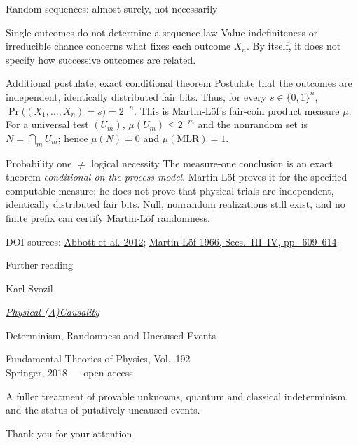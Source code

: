 \documentclass{beamer}
\newcommand{\doiref}[2]{%
  \href{https://doi.org/#1}{\textcolor{blue!65!black}{#2}}}
\newcommand{\sourcefoot}[1]{%
  \par\vfill{\tiny\color{black!60}DOI sources: #1\par}}
\begin{document}
\begin{frame}{Random sequences: almost surely, not necessarily}
\footnotesize
\begin{block}{Single outcomes do not determine a sequence law}
Value indefiniteness or irreducible chance concerns what fixes each outcome
$X_n$.  By itself, it does not specify how successive outcomes are related.
\end{block}

\begin{exampleblock}{Additional postulate; exact conditional theorem}
Postulate that the outcomes are independent, identically distributed fair
bits.  Thus, for every $s\in\{0,1\}^n$,
$\Pr\bigl((X_1,\ldots,X_n)=s\bigr)=2^{-n}$.  This is Martin-L\"of's fair-coin
product measure $\mu$.  For a universal test $(U_m)$,
$\mu(U_m)\leq2^{-m}$ and the nonrandom set is $N=\bigcap_m U_m$; hence
$\mu(N)=0$ and $\mu(\mathrm{MLR})=1$.
\end{exampleblock}

\begin{alertblock}{Probability one $\neq$ logical necessity}
The measure-one conclusion is an exact theorem \emph{conditional on the process
model}.  Martin-L\"of proves it for the specified computable measure; he does
not prove that physical trials are independent, identically distributed fair
bits.  Null, nonrandom
realizations still exist, and no finite prefix can certify Martin-L\"of
randomness.
\end{alertblock}

\sourcefoot{\doiref{10.1103/PhysRevA.86.062109}{Abbott et al. 2012};
\doiref{10.1016/S0019-9958(66)80018-9}{Martin-L\"of 1966,
Secs.~III--IV, pp.~609--614}.}
\end{frame}

\begin{frame}{Further reading}
\centering
\vfill
{\large Karl Svozil\par}
\vspace{0.65em}
{\LARGE\itshape
\doiref{10.1007/978-3-319-70815-7}{Physical (A)Causality}\par}
\vspace{0.45em}
{\large Determinism, Randomness and Uncaused Events\par}
\vspace{0.9em}
{\normalsize Fundamental Theories of Physics, Vol.~192\\
Springer, 2018 --- open access\par}
\vspace{1em}
\begin{minipage}{0.78\textwidth}
\centering
A fuller treatment of provable unknowns, quantum and classical
indeterminism, and the status of putatively uncaused events.
\end{minipage}
\vfill
{\Large \color{blue}Thank you for your attention\par}
\vspace{0.5em}
\end{frame}
\end{document}
